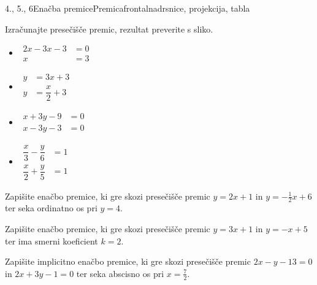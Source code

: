 \begin{priprava}{4., 5., 6}{}{Enačba premice}{Premica}{frontalna}{drsnice, projekcija, tabla}
            
            \begin{naloga}
                Izračunajte presečišče premic, rezultat preverite s sliko.
                \begin{multicols}{2}   
                \begin{itemize}
                        \item $\begin{aligned}
                            2x-3x-3&=0 \\ x&=3
                        \end{aligned}$ 
                        \item $\begin{aligned}
                            y&=3x+3 \\ y&=\dfrac{x}{2}+3
                        \end{aligned}$ 
                        \item $\begin{aligned}
                            x+3y-9&=0 \\ x-3y-3&=0
                        \end{aligned}$ 
                        \item $\begin{aligned}
                            \dfrac{x}{3}-\dfrac{y}{6}&=1 \\ \dfrac{x}{2}+\dfrac{y}{5}&=1
                        \end{aligned}$ 

                \end{itemize}
            \end{multicols}
            \end{naloga}

            
            \begin{naloga}
                Zapišite enačbo premice, ki gre skozi presečišče premic $y=2x+1$ in $y=-\frac{1}{2}x+6$ ter seka ordinatno os pri $y=4$.
            \end{naloga}

            \begin{naloga}
                Zapišite enačbo premice, ki gre skozi presečišče premic $y=3x+1$ in $y=-x+5$ ter ima smerni koeficient $k=2$.
            \end{naloga}

            \begin{naloga}
                Zapišite implicitno enačbo premice, ki gre skozi presečišče premic $2x-y-13=0$ in $2x+3y-1=0$ ter seka abscisno os pri $x=\frac{7}{2}$.
            \end{naloga}
        

\end{priprava}
